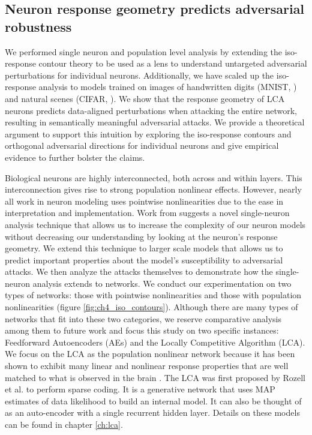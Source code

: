 \subsection{Neuron response geometry predicts adversarial robustness}\label{sec:ch4_neuron}
We performed single neuron and population level analysis by extending the iso-response contour theory to be used as a lens to understand untargeted adversarial perturbations for individual neurons. Additionally, we have scaled up the iso-response analysis to models trained on images of handwritten digits (MNIST, \cite{lecun1998mnist}) and natural scenes (CIFAR, \cite{krizhevsky2009learning}). We show that the response geometry of LCA neurons predicts data-aligned perturbations when attacking the entire network, resulting in semantically meaningful adversarial attacks. We provide a theoretical argument to support this intuition by exploring the iso-response contours and orthogonal adversarial directions for individual neurons and give empirical evidence to further bolster the claims. 

Biological neurons are highly interconnected, both across and within layers. This interconnection gives rise to strong population nonlinear effects. However, nearly all work in neuron modeling uses pointwise nonlinearities due to the ease in interpretation and implementation. Work from \citeyearpar{golden2016conjectures} suggests a novel single-neuron analysis technique that allows us to increase the complexity of our neuron models without decreasing our understanding by looking at the neuron’s response geometry. We extend this technique to larger scale models that allows us to predict important properties about the model’s susceptibility to adversarial attacks. We then analyze the attacks themselves to demonstrate how the single-neuron analysis extends to networks. We conduct our experimentation on two types of networks: those with pointwise nonlinearities and those with population nonlinearities (figure \ref{fig:ch4_iso_contours}). Although there are many types of networks that fit into these two categories, we reserve comparative analysis among them to future work and focus this study on two specific instances: Feedforward Autoencoders (AEs) and the Locally Competitive Algorithm (LCA). We focus on the LCA as the population nonlinear network because it has been shown to exhibit many linear and nonlinear response properties that are well matched to what is observed in the brain \parencite{zhu2013visual, olshausen1997sparse}. The LCA was first proposed by Rozell et al. \citeyearpar{rozell2008sparse} to perform sparse coding. It is a generative network that uses MAP estimates of data likelihood to build an internal model. It can also be thought of as an auto-encoder with a single recurrent hidden layer. Details on these models can be found in chapter \ref{ch:lca}.

